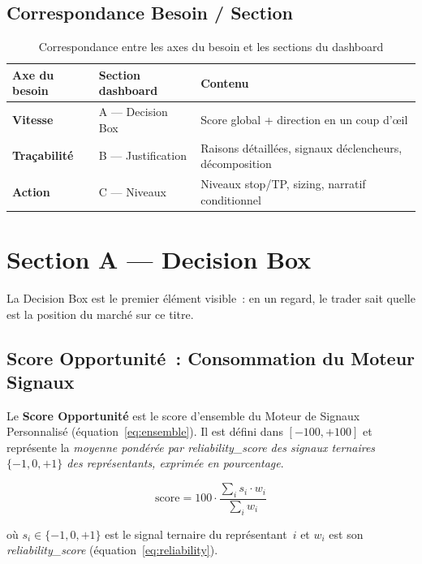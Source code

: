 \subsection{Correspondance Besoin / Section}

\begin{table}[H]
\centering
\caption{Correspondance entre les axes du besoin et les sections du dashboard}
\label{tab:besoin_section}
\begin{tabularx}{\linewidth}{@{}lYY@{}}
\toprule
\textbf{Axe du besoin} & \textbf{Section dashboard} & \textbf{Contenu} \\
\midrule
\textbf{Vitesse}       & A — Decision Box  & Score global + direction en un coup d'œil \\
\textbf{Traçabilité}   & B — Justification & Raisons détaillées, signaux déclencheurs, décomposition \\
\textbf{Action}        & C — Niveaux       & Niveaux stop/TP, sizing, narratif conditionnel \\
\bottomrule
\end{tabularx}
\end{table}

\section{Section A --- Decision Box}
\label{sec:decision_box}

La Decision Box est le premier élément visible~: en un regard, le trader sait
quelle est la position du marché sur ce titre.

\subsection{Score Opportunité~: Consommation du Moteur Signaux}

Le \textbf{Score Opportunité} est le score d'ensemble du Moteur de Signaux
Personnalisé (équation~\eqref{eq:ensemble}). Il est défini dans $[-100, +100]$
et représente la \emph{moyenne pondérée par reliability\_score des signaux ternaires
$\{-1, 0, +1\}$ des représentants, exprimée en pourcentage}.

\begin{equation}
\text{score} = 100 \cdot \frac{\displaystyle\sum_{i} s_i \cdot w_i}
                              {\displaystyle\sum_{i} w_i}
\label{eq:score_opportunite}
\end{equation}

où $s_i \in \{-1, 0, +1\}$ est le signal ternaire du représentant~$i$
et $w_i$ est son \emph{reliability\_score} (équation~\eqref{eq:reliability}).


